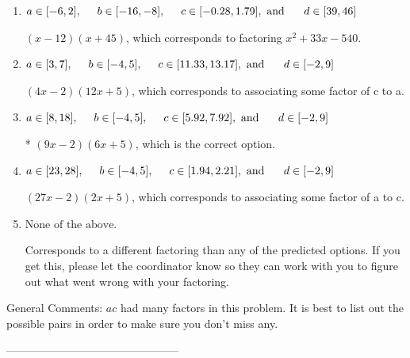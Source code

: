 \documentclass{article}[14pt]
\begin{document}
\begin{enumerate}[label=\Alph*.] 
\item $ a \in [-6, 2], \hspace*{5mm} b \in [-16, -8], \hspace*{5mm} c \in [-0.28, 1.79], \text{ and } \hspace*{5mm} d \in [39, 46] $ 

  $(x -12)(x + 45)$, which corresponds to factoring $x^{2} +33 x -540$. 
\item $ a \in [3, 7], \hspace*{5mm} b \in [-4, 5], \hspace*{5mm} c \in [11.33, 13.17], \text{ and } \hspace*{5mm} d \in [-2, 9] $ 

  $(4x -2)(12x + 5)$, which corresponds to associating some factor of c to a. 
\item $ a \in [8, 18], \hspace*{5mm} b \in [-4, 5], \hspace*{5mm} c \in [5.92, 7.92], \text{ and } \hspace*{5mm} d \in [-2, 9] $ 

 * $(9x -2)(6x + 5)$, which is the correct option. 
\item $ a \in [23, 28], \hspace*{5mm} b \in [-4, 5], \hspace*{5mm} c \in [1.94, 2.21], \text{ and } \hspace*{5mm} d \in [-2, 9] $ 

  $(27x -2)(2x + 5)$, which corresponds to associating some factor of a to c. 
\item $ \text{None of the above.} $ 

  Corresponds to a different factoring than any of the predicted options. If you get this, please let the coordinator know so they can work with you to figure out what went wrong with your factoring. 
\end{enumerate} 
 
General Comments: $ac$ had many factors in this problem. It is best to list out the possible pairs in order to make sure you don't miss any.

-----------------------------------------------
\end{document}
